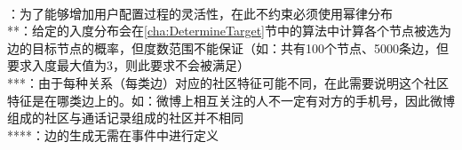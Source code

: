\begin{table}[htb]
\begin{minipage}[t]{1\textwidth}
\begin{tabularx}{\linewidth}{llX}
      \bottomrule[1.5pt]
    \end{tabularx}\\[2pt]
    \footnotesize *：为了能够增加用户配置过程的灵活性，在此不约束必须使用幂律分布\\ **：给定的入度分布会在\ref{cha:DetermineTarget}节中的算法中计算各个节点被选为边的目标节点的概率，但度数范围不能保证（如：共有100个节点、5000条边，但要求入度最大值为3，则此要求不会被满足）\\ ***：由于每种关系（每类边）对应的社区特征可能不同，在此需要说明这个社区特征是在哪类边上的。如：微博上相互关注的人不一定有对方的手机号，因此微博组成的社区与通话记录组成的社区并不相同\\ ****：边的生成无需在事件中进行定义
  \end{minipage}
\end{table}